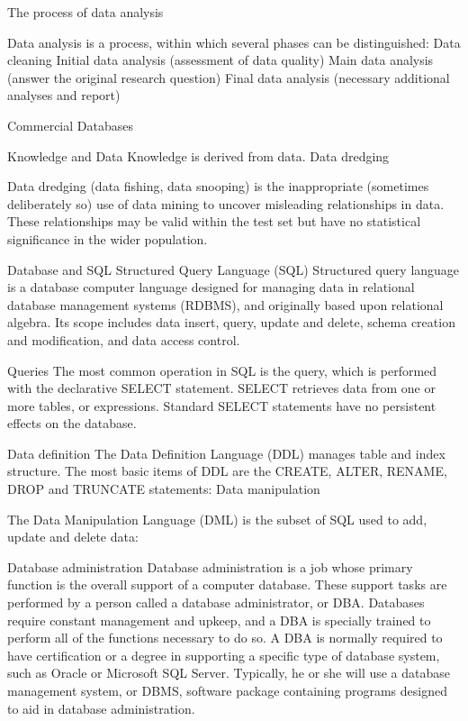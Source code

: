 The process of data analysis

Data analysis is a process, within which several phases can be distinguished:
Data cleaning
Initial data analysis (assessment of data quality)
Main data analysis (answer the original research question)
Final data analysis (necessary additional analyses and report)



Commercial Databases

Knowledge and Data
Knowledge is derived from data.
Data dredging

Data dredging (data fishing, data snooping) is the inappropriate (sometimes deliberately so) use of data mining to uncover misleading relationships in data. These relationships may be valid within the test set but have no statistical significance in the wider population.

Database and SQL
Structured Query Language (SQL) 
Structured query language is a database computer language designed for managing data in relational database management systems (RDBMS), and originally based upon relational algebra. Its scope includes data insert, query, update and delete, schema creation and modification, and data access control. 

Queries
The most common operation in SQL is the query, which is performed with the declarative SELECT statement. SELECT retrieves data from one or more tables, or expressions. Standard SELECT statements have no persistent effects on the database. 

Data definition
The Data Definition Language (DDL) manages table and index structure. The most basic items of DDL are the CREATE, ALTER, RENAME, DROP and TRUNCATE statements:
Data manipulation

The Data Manipulation Language (DML) is the subset of SQL used to add, update and delete data:

Database administration
Database administration is a job whose primary function is the overall support of a computer database. These support tasks are performed by a person called a database administrator, or DBA. Databases require constant management and upkeep, and a DBA is specially trained to perform all of the functions necessary to do so. A DBA is normally required to have certification or a degree in supporting a specific type of database system, such as Oracle or Microsoft SQL Server. Typically, he or she will use a database management system, or DBMS, software package containing programs designed to aid in database administration.

